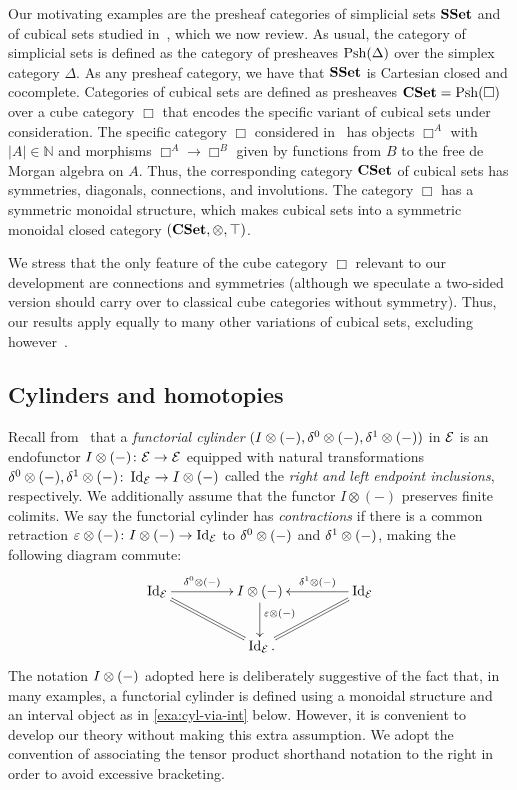\documentclass[reqno,10pt,a4paper,oneside,draft]{amsart}
\begin{document}
Our motivating examples are the presheaf categories of simplicial sets $\mathbf{SSet}$ and of cubical sets  studied in~\cite{coquand-variation}, which we now review. As usual, the category of simplicial sets is defined as the category of presheaves $\mathrm{Psh}(\Delta)$ over the simplex category $\Delta$. As any presheaf category, we have that $\mathbf{SSet}$ is Cartesian closed and cocomplete. Categories of cubical sets are defined as presheaves $\mathbf{CSet} = \mathrm{Psh}(\Box)$ over a cube category $\Box$ that encodes the specific variant of cubical sets under consideration. The specific category $\Box$ considered in~\cite{coquand-variation} has objects $\Box^A$ with $|A| \in \mathbb{N}$ and morphisms $\Box^A \to \Box^B$ given by functions from $B$ to the free de Morgan algebra on $A$.
Thus, the corresponding category $\mathbf{CSet}$ of cubical sets has symmetries, diagonals, connections, and involutions.
The category $\Box$ has a symmetric monoidal structure, which makes cubical sets into a symmetric monoidal closed category $(\mathbf{CSet}, \otimes, \top)$.

We stress that the only feature of the cube category $\Box$ relevant to our development are connections and symmetries (although we speculate a two-sided version should carry over to classical cube categories without symmetry).
Thus, our results apply equally to many other variations of cubical sets, excluding however~\cite{coquand-cubical-sets}.

\subsection*{Cylinders and homotopies}

Recall from~\cite{kamps-porter:homotopy} that a \emph{functorial cylinder} $(I \otimes (-), \delta^0 \otimes (-), \delta^1 \otimes (-))$ in $\mathcal{E}$ is an endofunctor $I \otimes (-) \colon \mathcal{E} \to \mathcal{E}$ equipped with natural transformations $\delta^0 \otimes (-), \delta^1 \otimes (-) \colon \operatorname{Id}_{\mathcal{E}} \to I \otimes (-)$ called the \emph{right and left endpoint inclusions}, respectively.
We additionally assume that the functor $I \otimes (-)$ preserves finite colimits.
We say the functorial cylinder has \emph{contractions} if there is a common retraction $\varepsilon \otimes (-) \colon I \otimes (-) \to \operatorname{Id}_{\mathcal{E}}$ to $\delta^0 \otimes (-)$ and $\delta^1 \otimes (-)$, making the following diagram commute:
\[
\xymatrix@C+2em{
  \Id_\catE
  \ar[r]^-{\lcyl \otimes (-)}
  \ar@{=}[dr]
&
  \interval \otimes (-)
  \ar[d]^(0.4){\ccyl \otimes (-)}
&
  \Id_\catE
  \ar[l]_-{\rcyl \otimes (-)}
  \ar@{=}[dl]
\\&
  \Id_\catE
\rlap{.}}
\]
The notation $I \otimes (-)$ adopted here is deliberately suggestive of the fact that, in many examples, a functorial cylinder is defined using a monoidal structure and an interval object as in \cref{exa:cyl-via-int} below.
However, it is convenient to develop our theory without making this extra assumption.
We adopt the convention of associating the tensor product shorthand notation to the right in order to avoid excessive bracketing.
\end{document}
